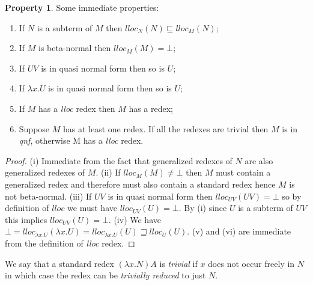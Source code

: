 \documentclass{article}
\theoremstyle{definition}
\newtheorem{property}{Property}[section]
\begin{document}
\begin{property}
\label{prop:lloc_properties}
Some immediate properties:
\begin{enumerate}[label=(\roman*)]
\item
 If $N$ is a subterm of $M$ then $lloc_N(N) \sqsubseteq lloc_M(N)$;
\item
 If $M$ is beta-normal then $lloc_M(M) = \bot$;
 \item
 If $U V$ is in quasi normal form then so is $U$;
\item
 If $\lambda x . U$ is in quasi normal form then so is $U$;
 \item If $M$ has a \emph{lloc} redex then $M$ has a redex;
 \item Suppose $M$ has at least one redex.
 If all the redexes are trivial then $M$ is in \emph{qnf}, otherwise M has a \emph{lloc} redex.
\end{enumerate}
\end{property}
\begin{proof}
(i) Immediate from the fact that generalized redexes of $N$ are also generalized redexes of $M$. (ii) If $lloc_M(M) \neq \bot$ then $M$ must contain a generalized redex and therefore must also contain a standard redex hence $M$ is not beta-normal.
(iii) If $U V$ is in quasi normal form then $lloc_{UV}(UV) = \bot$ so by definition of $lloc$ we must have $lloc_{UV}(U) = \bot$. By (i) since $U$ is a subterm of $UV$ this implies $lloc_{UV}(U) = \bot$.
(iv) We have $\bot = lloc_{\lambda x . U}(\lambda x . U) = lloc_{\lambda x . U}(U) \sqsupseteq lloc_{U}(U)$.
(v) and (vi) are immediate from the definition of \emph{lloc} redex.
\end{proof}

We say that a standard redex $(\lambda x. N) A$ is \emph{trivial} if $x$ does not occur freely in $N$ in which case the redex can be \emph{trivially reduced} to just $N$.
\end{document}
